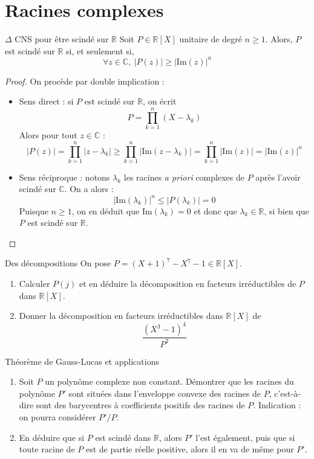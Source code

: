 \documentclass[french,a4paper]{article}
\newcommand{\R}{\mathbb{R}}
\newcommand{\C}{\mathbb{C}}
\newcommand{\im}{\text{Im}}
\theoremstyle{plain}
\theoremstyle{definition}
\theoremstyle{remark}
\begin{document}
\section{Racines complexes}

\begin{ex}[Moulin.12]{$\Delta$ CNS pour être scindé sur $\R$}
	Soit $P\in\R[X]$ unitaire de degré $n\geqslant1$. Alors, $P$ est scindé sur $\R$ si, et seulement si, $$\forall z\in\C,\ \lvert P(z)\rvert\geqslant\lvert\im(z)\rvert^n$$
\end{ex}
\begin{proof}
	On procède par double implication :
	\begin{itemize}
		\item Sens direct : si $P$ est scindé sur $\R$, on écrit $$P=\prod_{k=1}^{n}(X-\lambda_k)$$ Alors pour tout $z\in\C$ : $$\lvert P(z)\rvert=\prod_{k=1}^{n}\lvert z-\lambda_k\rvert \geqslant \prod_{k=1}^{n}\lvert\im(z-\lambda_k)\rvert=\prod_{k=1}^{n}\lvert\im(z)\rvert=\lvert\im(z)\rvert ^n$$
		\item Sens réciproque : notons $\lambda_k$ les racines \textit{a priori} complexes de $P$ après l'avoir scindé sur $\C$. On a alors : $$\lvert\im(\lambda_k)\rvert^n\leqslant\lvert P(\lambda_k)\rvert=0$$ Puisque $n\geqslant1$, on en déduit que $\im(\lambda_k)=0$ et donc que $\lambda_k\in\R$, si bien que $P$ est scindé sur $\R$.
	\end{itemize}
\end{proof}

\begin{ex}[Moulin.13]{Des décompositions}
	On pose $P=(X+1)^7-X^7-1\in\R[X]$.
	\begin{enumerate}
		\item Calculer $P(j)$ et en déduire la décomposition en facteurs irréductibles de $P$ dans $\R[X]$.
		\item Donner la décomposition en facteurs irréductibles dans $\R[X]$ de $$\frac{(X^3-1)^4}{P^2}$$
	\end{enumerate}
\end{ex}

\begin{ex}[Châteaux]{Théorème de Gauss-Lucas et applications}
	\begin{enumerate}
		\item Soit $P$ un polynôme complexe non constant. Démontrer que les racines du polynôme $P'$ sont situées dans l'enveloppe convexe des racines de $P$, c'est-à-dire sont des barycentres à coefficients positifs des racines de $P$. Indication : on pourra considérer $P'/P$.
		\item En déduire que si $P$ est scindé dans $\R$, alors $P'$ l'est également, puis que si toute racine de $P$ est de partie réelle positive, alors il en va de même pour $P'$.
	\end{enumerate}
\end{ex}
\end{document}
